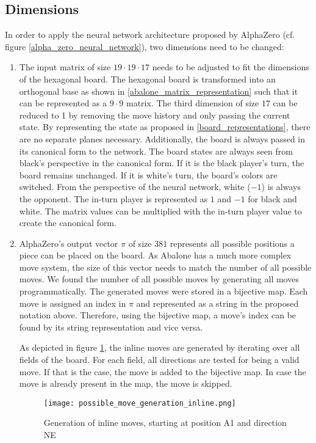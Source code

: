 \subsection{Dimensions}
In order to apply the neural network architecture proposed by AlphaZero (cf. figure \ref{alpha_zero_neural_network}), two dimensions need to be changed:
\begin{enumerate}
    \item The input matrix of size $19 \cdot 19 \cdot 17$ needs to be adjusted to fit the dimensions of the hexagonal board. The hexagonal board is transformed into an orthogonal base as shown in \ref{abalone_matrix_representation} such that it can be represented as a $9 \cdot 9$ matrix.
          The third dimension of size $17$ can be reduced to 1 by removing the move history and only passing the current state. By representing the state as proposed in \ref{board_representations}, there are no separate planes necessary. Additionally, the board is always passed in its canonical form to the network. The board states are always seen from black's perspective in the canonical form. If it is the black player's turn, the board remains unchanged. If it is white's turn, the board's colors are switched. From the perspective of the neural network, white ($-1$) is always the opponent. The in-turn player is represented as $1$ and $-1$ for black and white. The matrix values can be multiplied with the in-turn player value to create the canonical form.
    \item AlphaZero's output vector $\pi$ of size 381 represents all possible positions a piece can be placed on the board. As Abalone has a much more complex move system, the size of this vector needs to match the number of all possible moves. We found the number of all possible moves by generating all moves programmatically. The generated moves were stored in a bijective map. Each move is assigned an index in $\pi$ and represented as a string in the proposed notation above. Therefore, using the bijective map, a move's index can be found by its string representation and vice versa.

          As depicted in figure \ref{possible_move_generation_inline}, the inline moves are generated by iterating over all fields of the board. For each field, all directions are tested for being a valid move. If that is the case, the move is added to the bijective map. In case the move is already present in the map, the move is skipped.

          \begin{figure}
              \centering
              \texttt{[image: possible\_move\_generation\_inline.png]}
              \caption{Generation of inline moves, starting at position A1 and direction NE}
              \label{possible_move_generation_inline}
          \end{figure}


\end{enumerate}
